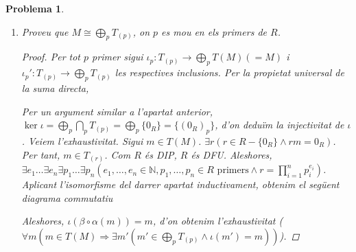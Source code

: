 \documentclass[compress]{article}
\newtheorem{problema}{Problema}
\theoremstyle{definition}
\begin{document}
\begin{problema}
\begin{enumerate}
\begin{proof}
        \end{proof}
        \item Proveu que $M\cong\bigoplus_{p}T_{(p)}$, on $p$ es mou en els primers de $R$.
        \begin{proof}
            Per tot $p$ primer sigui $\iota_{p}:T_{(p)}\rightarrow\bigoplus_{p}T(M)(=M)$ i $\iota_{p}':T_{(p)}\rightarrow\bigoplus_{p}T_{(p)}$ les respectives inclusions. Per la propietat universal de la suma directa,
            \begin{center}
            \end{center}
            Per un argument similar a l'apartat anterior, $\ker{\iota}=\bigoplus_{p}\bigcap_{p}T_{(p)}=\bigoplus_{p}\{0_{R}\}=\{(0_{R})_{p}\}$, d'on deduïm la injectivitat de $\iota$.\newline
            Veiem l'exhaustivitat. Sigui $m\in T(M)$. $\exists r(r\in R-\{0_{R}\}\land rm=0_{R})$. Per tant, $m\in T_{(r)}$. Com $R$ és DIP, $R$ és DFU. Aleshores, $\exists e_{1}\ldots\exists e_{n}\exists p_{1}\ldots\exists p_{n}(e_{1},\ldots,e_{n}\in\mathbb{N},p_{1},\ldots,p_{n}\in R\textrm{ primers}\land r=\prod_{i=1}^{n}p_{i}^{e_{i}})$. Aplicant l'isomorfisme del darrer apartat inductivament, obtenim el següent diagrama commutatiu
            \begin{center}
            \end{center}
            Aleshores, $\iota(\beta\circ\alpha(m))=m$, d'on obtenim l'exhaustivitat ($\forall m(m\in T(M)\Rightarrow\exists m'(m'\in\bigoplus_{p}T_{(p)}\land\iota(m')=m))$).
        \end{proof}
    \end{enumerate}
\end{problema}
\end{document}
